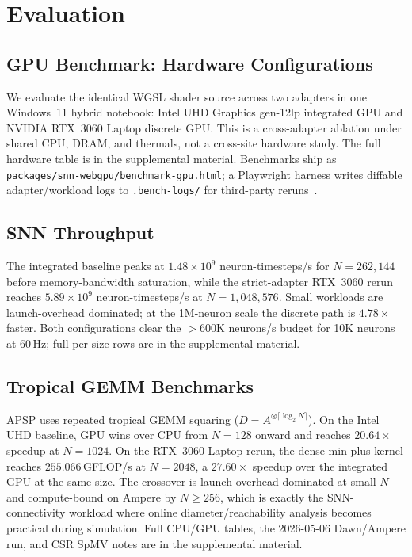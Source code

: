 \documentclass[10pt]{article}
\begin{document}
\section{Evaluation}
\label{sec:evaluation}

\subsection{GPU Benchmark: Hardware Configurations}
\label{sec:hardware}

We evaluate the identical WGSL shader source across two adapters in one
Windows~11 hybrid notebook: Intel UHD Graphics gen-12lp integrated GPU and
NVIDIA RTX~3060 Laptop discrete GPU.
This is a cross-adapter ablation under shared CPU, DRAM, and thermals, not a
cross-site hardware study.
The full hardware table is in the supplemental material.
Benchmarks ship as \texttt{packages/snn-webgpu/benchmark-gpu.html}; a
Playwright harness writes diffable adapter/workload logs to \texttt{.bench-logs/}
for third-party reruns~\cite{snn-webgpu-harness-2026}.

\subsection{SNN Throughput}
\label{sec:lif-throughput}

The integrated baseline peaks at $1.48\times10^9$ neuron-timesteps/s for
$N=262{,}144$ before memory-bandwidth saturation, while the strict-adapter
RTX~3060 rerun reaches $5.89\times10^9$ neuron-timesteps/s at
$N=1{,}048{,}576$.
Small workloads are launch-overhead dominated; at the 1M-neuron scale the
discrete path is $4.78\times$ faster.
Both configurations clear the $>600$K neurons/s budget for 10K neurons at
60\,Hz; full per-size rows are in the supplemental material.

\subsection{Tropical GEMM Benchmarks}
\label{sec:tropical-benchmarks}

APSP uses repeated tropical GEMM squaring
($D=A^{\otimes\lceil\log_2N\rceil}$). On the Intel UHD baseline, GPU wins over
CPU from $N=128$ onward and reaches $20.64\times$ speedup at $N=1024$.
On the RTX~3060 Laptop rerun, the dense min-plus kernel reaches
$255.066$\,GFLOP/s at $N=2048$, a $27.60\times$ speedup over the integrated
GPU at the same size.
The crossover is launch-overhead dominated at small $N$ and compute-bound on
Ampere by $N\ge256$, which is exactly the SNN-connectivity workload where
online diameter/reachability analysis becomes practical during simulation.
Full CPU/GPU tables, the 2026-05-06 Dawn/Ampere run, and CSR SpMV notes are in
the supplemental material.
\end{document}
